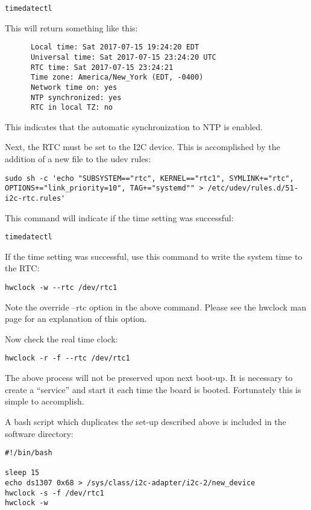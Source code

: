 \begin{verbatim}
timedatectl
\end{verbatim}

This will return something like this:

\begin{verbatim}
      Local time: Sat 2017-07-15 19:24:20 EDT
      Universal time: Sat 2017-07-15 23:24:20 UTC
      RTC time: Sat 2017-07-15 23:24:21
      Time zone: America/New_York (EDT, -0400)
      Network time on: yes
      NTP synchronized: yes
      RTC in local TZ: no
\end{verbatim}

This indicates that the automatic synchronization to NTP is enabled.

Next, the RTC must be set to the I2C device.  This is accomplished by the addition of a new file to the udev rules:

\begin{verbatim}
sudo sh -c 'echo "SUBSYSTEM=="rtc", KERNEL=="rtc1", SYMLINK+="rtc", OPTIONS+="link_priority=10", TAG+="systemd"" > /etc/udev/rules.d/51-i2c-rtc.rules'
\end{verbatim}

This command will indicate if the time setting was successful:

\begin{verbatim}
timedatectl
\end{verbatim}

If the time setting was successful, use this command to write the system time to the RTC:

\begin{verbatim}
hwclock -w --rtc /dev/rtc1
\end{verbatim}

Note the override --rtc option in the above command.  Please see the hwclock man page for an explanation of this option.

Now check the real time clock:

\begin{verbatim}
hwclock -r -f --rtc /dev/rtc1
\end{verbatim}

The above process will not be preserved upon next boot-up.  It is necessary to create a ``service'' and start it each time the board is booted.  Fortunately this is simple to accomplish.

A bash script which duplicates the set-up described above is included in the software directory:

\begin{verbatim}
#!/bin/bash

sleep 15
echo ds1307 0x68 > /sys/class/i2c-adapter/i2c-2/new_device
hwclock -s -f /dev/rtc1
hwclock -w
\end{verbatim}

